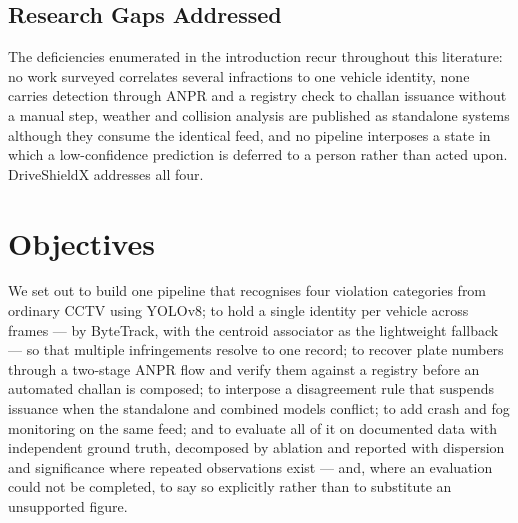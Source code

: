 \documentclass[10pt,a4paper,twocolumn]{article}
\begin{document}
\subsection{Research Gaps Addressed}
The deficiencies enumerated in the introduction recur throughout this literature: no work surveyed correlates several
infractions to one vehicle identity, none carries detection through ANPR and a registry check to challan issuance
without a manual step, weather and collision analysis are published as standalone systems although they consume the
identical feed, and no pipeline interposes a state in which a low-confidence prediction is deferred to a person rather
than acted upon. DriveShieldX addresses all four.

\section{Objectives}
We set out to build one pipeline that recognises four violation categories from ordinary CCTV using YOLOv8; to hold a
single identity per vehicle across frames --- by ByteTrack, with the centroid associator as the
lightweight fallback --- so that multiple infringements resolve to one record; to recover plate numbers through a
two-stage ANPR flow and verify them against a registry before an automated challan is composed; to interpose a
disagreement rule that suspends issuance when the standalone and combined models conflict; to add crash and fog
monitoring on the same feed; and to evaluate all of it on documented data with independent ground truth, decomposed by
ablation and reported with dispersion and significance where repeated observations exist --- and, where an
evaluation could not be completed, to say so explicitly rather than to substitute an unsupported figure.

\end{document}
